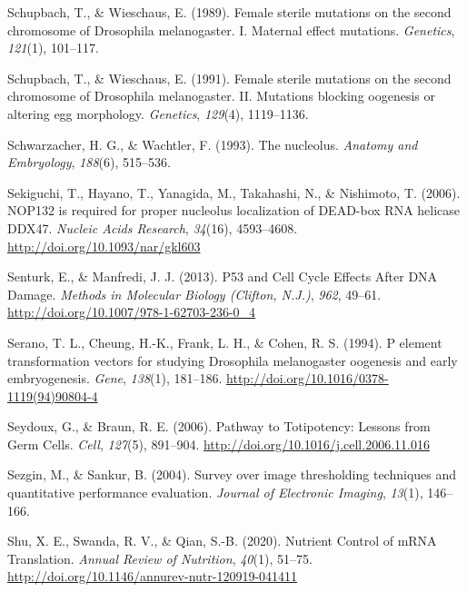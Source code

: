 \documentclass[12pt,twoside]{reedthesis}
\newlength{\cslhangindent}
\newenvironment{cslreferences}%
  {\setlength{\parindent}{0pt}%
  \everypar{\setlength{\hangindent}{\cslhangindent}}\ignorespaces}%
  {\par}
\begin{document}
\begin{cslreferences}
\leavevmode\hypertarget{ref-Schupbach1989c}{}%
Schupbach, T., \& Wieschaus, E. (1989). Female sterile mutations on the second chromosome of Drosophila melanogaster. I. Maternal effect mutations. \emph{Genetics}, \emph{121}(1), 101--117.

\leavevmode\hypertarget{ref-Schupbach1991f}{}%
Schupbach, T., \& Wieschaus, E. (1991). Female sterile mutations on the second chromosome of Drosophila melanogaster. II. Mutations blocking oogenesis or altering egg morphology. \emph{Genetics}, \emph{129}(4), 1119--1136.

\leavevmode\hypertarget{ref-Schwarzacher1993}{}%
Schwarzacher, H. G., \& Wachtler, F. (1993). The nucleolus. \emph{Anatomy and Embryology}, \emph{188}(6), 515--536.

\leavevmode\hypertarget{ref-sekiguchiNOP132RequiredProper2006}{}%
Sekiguchi, T., Hayano, T., Yanagida, M., Takahashi, N., \& Nishimoto, T. (2006). NOP132 is required for proper nucleolus localization of DEAD-box RNA helicase DDX47. \emph{Nucleic Acids Research}, \emph{34}(16), 4593--4608. \url{http://doi.org/10.1093/nar/gkl603}

\leavevmode\hypertarget{ref-senturkP53CellCycle2013}{}%
Senturk, E., \& Manfredi, J. J. (2013). P53 and Cell Cycle Effects After DNA Damage. \emph{Methods in Molecular Biology (Clifton, N.J.)}, \emph{962}, 49--61. \url{http://doi.org/10.1007/978-1-62703-236-0_4}

\leavevmode\hypertarget{ref-seranoElementTransformationVectors1994}{}%
Serano, T. L., Cheung, H.-K., Frank, L. H., \& Cohen, R. S. (1994). P element transformation vectors for studying Drosophila melanogaster oogenesis and early embryogenesis. \emph{Gene}, \emph{138}(1), 181--186. \url{http://doi.org/10.1016/0378-1119(94)90804-4}

\leavevmode\hypertarget{ref-Seydoux2006}{}%
Seydoux, G., \& Braun, R. E. (2006). Pathway to Totipotency: Lessons from Germ Cells. \emph{Cell}, \emph{127}(5), 891--904. \url{http://doi.org/10.1016/j.cell.2006.11.016}

\leavevmode\hypertarget{ref-sezginSurveyImageThresholding2004}{}%
Sezgin, M., \& Sankur, B. (2004). Survey over image thresholding techniques and quantitative performance evaluation. \emph{Journal of Electronic Imaging}, \emph{13}(1), 146--166.

\leavevmode\hypertarget{ref-shuNutrientControlMRNA2020}{}%
Shu, X. E., Swanda, R. V., \& Qian, S.-B. (2020). Nutrient Control of mRNA Translation. \emph{Annual Review of Nutrition}, \emph{40}(1), 51--75. \url{http://doi.org/10.1146/annurev-nutr-120919-041411}


\end{cslreferences}
\end{document}
